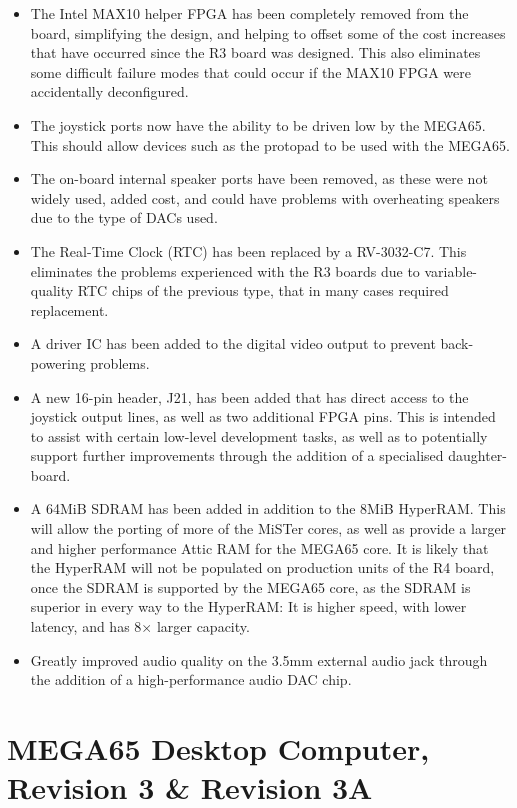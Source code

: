 \begin{itemize}
\item The Intel\texttrademark{} MAX10\texttrademark{} helper FPGA has been completely removed from the board, simplifying the design, and helping to offset some of the cost increases that have occurred since the R3 board was designed.  This also eliminates some difficult failure modes that could occur if the MAX10 FPGA were accidentally deconfigured.
\item The joystick ports now have the ability to be driven low by the MEGA65. This should allow devices such as the protopad\texttrademark{} to be used with the MEGA65.
\item The on-board internal speaker ports have been removed, as these were not widely used, added cost, and could have problems with overheating speakers due to the type of DACs used.
\item The Real-Time Clock (RTC) has been replaced by a RV-3032-C7. This eliminates the problems experienced with the R3 boards due to variable-quality RTC chips of the previous type, that in many cases required replacement.
\item A driver IC has been added to the digital video output to prevent back-powering problems.
\item A new 16-pin header, J21, has been added that has direct access to the joystick output lines, as well as two additional FPGA pins. This is intended to assist with certain low-level development tasks, as well as to potentially support further improvements through the addition of a specialised daughter-board.
\item A 64MiB SDRAM has been added in addition to the 8MiB HyperRAM. This will allow the porting of more of the MiSTer cores, as well as provide a larger and higher performance Attic RAM for the MEGA65 core.  It is likely that the HyperRAM will not be populated on production units of the R4 board, once the SDRAM is supported by the MEGA65 core, as the SDRAM is superior in every way to the HyperRAM: It is higher speed, with lower latency, and has 8$\times$ larger capacity.
  \item Greatly improved audio quality on the 3.5mm external audio jack through the addition of a high-performance audio DAC chip.
\end{itemize}

\section{MEGA65 Desktop Computer, Revision 3 \& Revision 3A}

